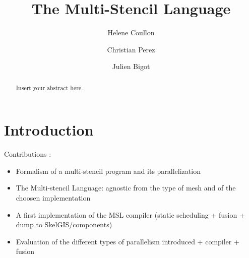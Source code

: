 \documentclass[twocolumn]{svjour3}          %
\begin{document}
\title{The Multi-Stencil Language}


\author{Helene Coullon         \and
        Christian Perez \and
        Julien Bigot
}





\maketitle

\begin{abstract}
Insert your abstract here.
\end{abstract}

\section{Introduction}
\label{sect:introduction}
Contributions :
\begin{itemize}
\item Formalism of a multi-stencil program and its parallelization
\item The Multi-stencil Language: agnostic from the type of mesh and of the choosen implementation
\item A first implementation of the MSL compiler (static scheduling + fusion + dump to SkelGIS/components)
\item Evaluation of the different types of parallelism introduced + compiler + fusion
\end{itemize}
\end{document}
